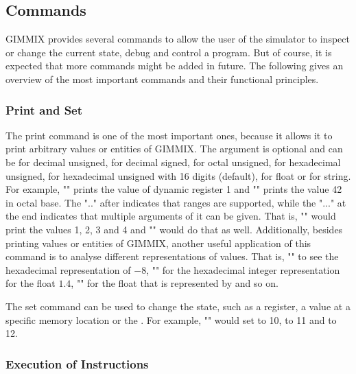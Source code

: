 \subsection{Commands}

GIMMIX provides several commands to allow the user of the simulator to inspect or change the current state, debug and control a program. But of course, it is expected that more commands might be added in future. The following gives an overview of the most important commands and their functional principles.

\subsubsection{Print and Set}

\noindent The print command is one of the most important ones, because it allows it to print arbitrary values or entities of GIMMIX. The argument  is optional and can be  for decimal unsigned,  for decimal signed,  for octal unsigned,  for hexadecimal unsigned,  for hexadecimal unsigned with 16 digits (default),  for float or  for string. For example, "" prints the value of dynamic register 1 and "" prints the value 42 in octal base. The ".." after  indicates that ranges are supported, while the "..." at the end indicates that multiple arguments of it can be given. That is, "" would print the values 1, 2, 3 and 4 and "" would do that as well. Additionally, besides printing values or entities of GIMMIX, another useful application of this command is to analyse different representations of values. That is, "" to see the hexadecimal representation of $-8$, "" for the hexadecimal integer representation for the float $1.4$, "" for the float that is represented by  and so on.

\noindent The set command can be used to change the state, such as a register, a value at a specific memory location or the . For example, "" would set  to 10,  to 11 and  to 12.

\subsubsection{Execution of Instructions}

